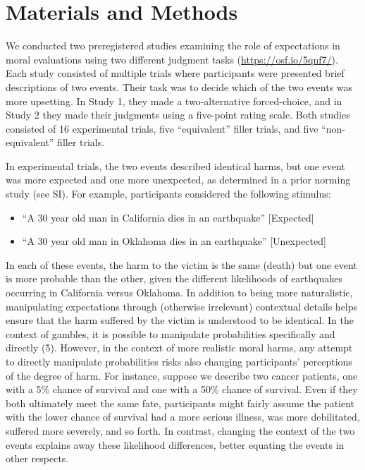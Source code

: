 \documentclass[9pt,twocolumn,twoside,lineno]{pnas-new}
\begin{document}
\section*{Materials and Methods}\label{materials-and-methods}

We conducted two preregistered studies examining the role of
expectations in moral evaluations using two different judgment tasks
(\url{https://osf.io/5qnf7/}). Each study consisted of multiple trials
where participants were presented brief descriptions of two events.
Their task was to decide which of the two events was more upsetting. In
Study 1, they made a two-alternative forced-choice, and in Study 2 they
made their judgments using a five-point rating scale. Both studies
consisted of 16 experimental trials, five ``equivalent'' filler trials,
and five ``non-equivalent'' filler trials.

In experimental trials, the two events described identical harms, but
one event was more expected and one more unexpected, as determined in a
prior norming study (see SI). For example, participants considered the
following stimulus:

\begin{itemize}
\item
  ``A 30 year old man in California dies in an earthquake''
  {[}Expected{]}
\item
  ``A 30 year old man in Oklahoma dies in an earthquake''
  {[}Unexpected{]}
\end{itemize}

In each of these events, the harm to the victim is the same (death) but
one event is more probable than the other, given the different
likelihoods of earthquakes occurring in California versus Oklahoma. In
addition to being more naturalistic, manipulating expectations through
(otherwise irrelevant) contextual details helps ensure that the harm
suffered by the victim is understood to be identical. In the context of
gambles, it is possible to manipulate probabilities specifically and
directly (5). However, in the context of more realistic moral harms, any
attempt to directly manipulate probabilities risks also changing
participants' perceptions of the degree of harm. For instance, suppose
we describe two cancer patients, one with a 5\% chance of survival and
one with a 50\% chance of survival. Even if they both ultimately meet
the same fate, participants might fairly assume the patient with the
lower chance of survival had a more serious illness, was more
debilitated, suffered more severely, and so forth. In contrast, changing
the context of the two events explains away these likelihood
differences, better equating the events in other respects.
\end{document}
